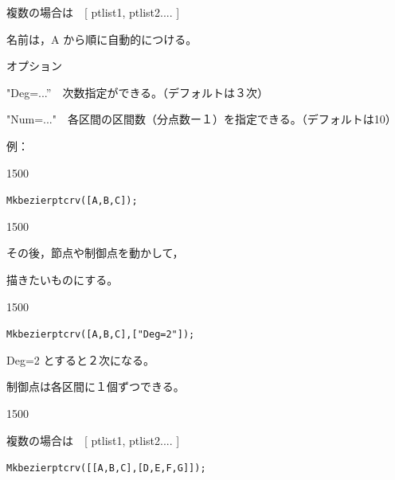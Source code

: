 \documentclass[papersize,a4paper,12pt,uplatex]{jsarticle}
\begin{document}
\begin{description}
複数の場合は　[ ptlist1, ptlist2.... ]

名前は，A から順に自動的につける。

オプション

"Deg=...”　次数指定ができる。（デフォルトは３次）

"Num=..."　各区間の区間数（分点数ー１）を指定できる。（デフォルトは10）

\vspace{5mm}

例：

\begin{layer}{150}{0}
\end{layer}

\verb|Mkbezierptcrv([A,B,C]);|


\vspace{25mm}

\begin{layer}{150}{0}
\end{layer}

その後，節点や制御点を動かして，

描きたいものにする。

\vspace{30mm}

\begin{layer}{150}{0}
\end{layer}

\verb|Mkbezierptcrv([A,B,C],["Deg=2"]);|

Deg=2 とすると２次になる。

制御点は各区間に１個ずつできる。

\vspace{20mm}

\begin{layer}{150}{0}
\end{layer}

複数の場合は　[ ptlist1, ptlist2.... ]

\verb|Mkbezierptcrv([[A,B,C],[D,E,F,G]]);|

\vspace{25mm}
　\\



\end{description}
\end{document}
